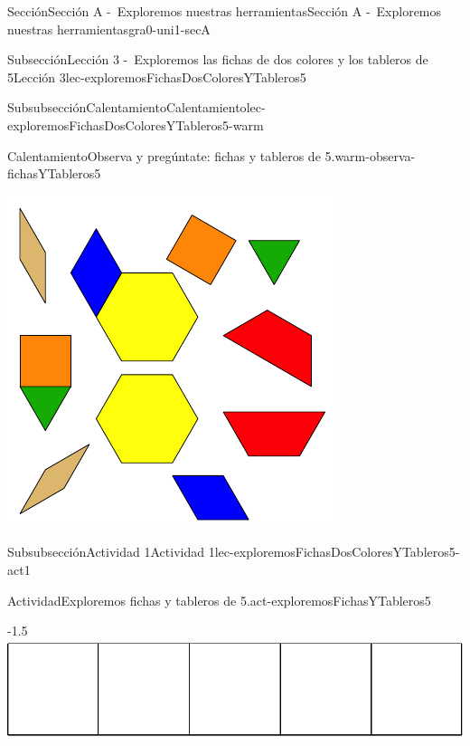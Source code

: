 \documentclass[twoside,10pt,]{article}
\begin{document}
\begin{sectionptx}{Sección}{Sección A -~Exploremos nuestras herramientas}{}{Sección A -~Exploremos nuestras herramientas}{}{}{gra0-uni1-secA}
\begin{subsectionptx}{Subsección}{Lección 3 -~Exploremos las fichas de dos colores y los tableros de 5}{}{Lección 3}{}{}{lec-exploremosFichasDosColoresYTableros5}
\begin{subsubsectionptx}{Subsubsección}{Calentamiento}{}{Calentamiento}{}{}{lec-exploremosFichasDosColoresYTableros5-warm}
\begin{exploration}{Calentamiento}{Observa y pregúntate: fichas y tableros de 5.}{warm-observa-fichasYTableros5}
\begin{sidebyside}{2}{0.05}{0.05}{0.1}
\begin{sbspanel}{0.4}
\includegraphics[width=\linewidth]{external/svg-source/tikz-file-147344.pdf}
\end{sbspanel}%
\end{sidebyside}%
\end{exploration}%
\end{subsubsectionptx}
%
%
\typeout{************************************************}
\typeout{************************************************}
%
\begin{subsubsectionptx}{Subsubsección}{Actividad 1}{}{Actividad 1}{}{}{lec-exploremosFichasDosColoresYTableros5-act1}
\begin{activity}{Actividad}{Exploremos fichas y tableros de 5.}{act-exploremosFichasYTableros5}%
\begin{image}{0}{1}{0}{-1.5\baselineskip}%
\includegraphics[width=\linewidth]{external/svg-source/tikz-file-148144.pdf}
\end{image}%
\end{activity}%
\end{subsubsectionptx}

\end{subsectionptx}
\end{sectionptx}
\end{document}

